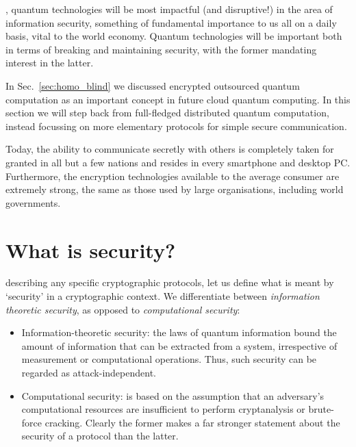 %
%

, quantum technologies will be most impactful (and disruptive!) in the area of information security, something of fundamental importance to us all on a daily basis, vital to the world economy. Quantum technologies will be important both in terms of breaking and maintaining security, with the former mandating interest in the latter.

In Sec.~\ref{sec:homo_blind} we discussed encrypted outsourced quantum computation as an important concept in future cloud quantum computing. In this section we will step back from full-fledged distributed quantum computation, instead focussing on more elementary protocols for simple secure communication.

Today, the ability to communicate secretly with others is completely taken for granted in all but a few nations and resides in every smartphone and desktop PC. Furthermore, the encryption technologies available to the average consumer are extremely strong, the same as those used by large organisations, including world governments.

%
%

\section{What is security?}\label{sec:comp_vs_inf_th_sec}

 describing any specific cryptographic protocols, let us define what is meant by `security' in a cryptographic context. We differentiate between \textit{information theoretic security}, as opposed to \textit{computational security}:

\begin{itemize}
	\item Information-theoretic security: the laws of quantum information bound the amount of information that can be extracted from a system, irrespective of measurement or computational operations. Thus, such security can be regarded as attack-independent.
	\item Computational security: is based on the assumption that an adversary's computational resources are insufficient to perform cryptanalysis or brute-force cracking. Clearly the former makes a far stronger statement about the security of a protocol than the latter.
\end{itemize}

